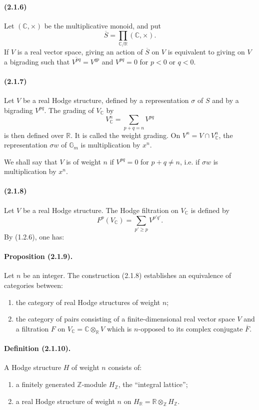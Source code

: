 \documentclass[10pt]{article}
\newcommand{\C}{\mathbb C}
\newcommand{\Z}{\mathbb Z}
\newcommand{\R}{\mathbb R}
\newcommand{\Gm}{\mathbb G_m}
\begin{document}
\paragraph{(2.1.6)} Let $(\C,\times)$ be the multiplicative monoid, and put
\[
\overline S=\prod_{\C/\R}(\C,\times).
\]
If $V$ is a real vector space, giving an action of $\overline S$ on $V$ is equivalent to giving on $V$ a bigrading such that $\overline{V^{pq}}=V^{qp}$ and $V^{pq}=0$ for $p<0$ or $q<0$.

\paragraph{(2.1.7)} Let $V$ be a real Hodge structure, defined by a representation $\sigma$ of $S$ and by a bigrading $V^{pq}$. The grading of $V_\C$ by
\[
V_\C^n=\sum_{p+q=n}V^{pq}
\]
is then defined over $\R$. It is called the weight grading. On $V^n=V\cap V_\C^n$, the representation $\sigma w$ of $\Gm$ is multiplication by $x^n$.

We shall say that $V$ is of weight $n$ if $V^{pq}=0$ for $p+q\ne n$, i.e. if $\sigma w$ is multiplication by $x^n$.

\paragraph{(2.1.8)} Let $V$ be a real Hodge structure. The Hodge filtration on $V_\C$ is defined by
\[
F^p(V_\C)=\sum_{p'\ge p}V^{p'q'}.
\]
By (1.2.6), one has:

\paragraph{Proposition (2.1.9).} Let $n$ be an integer. The construction (2.1.8) establishes an equivalence of categories between:
\begin{enumerate}[label=\alph*)]
\item the category of real Hodge structures of weight $n$;
\item the category of pairs consisting of a finite-dimensional real vector space $V$ and a filtration $F$ on $V_\C=\C\otimes_\R V$ which is $n$-opposed to its complex conjugate $\overline F$.
\end{enumerate}

\paragraph{Definition (2.1.10).} A Hodge structure $H$ of weight $n$ consists of:
\begin{enumerate}[label=\alph*)]
\item a finitely generated $\Z$-module $H_\Z$, the ``integral lattice'';
\item a real Hodge structure of weight $n$ on $H_\R=\R\otimes_\Z H_\Z$.
\end{enumerate}
\end{document}
